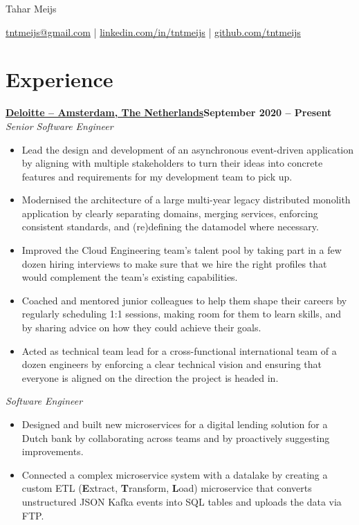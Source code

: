 \documentclass[11pt]{article}       %
\begin{document}
\centerline{\Huge Tahar Meijs}

\vspace{5pt}

\centerline{\href{mailto:tntmeijs@gmail.com}{tntmeijs@gmail.com} | \href{https://www.linkedin.com/in/tntmeijs/}{linkedin.com/in/tntmeijs} | \href{https://github.com/tntmeijs}{github.com/tntmeijs}}

\section*{Experience}
\textbf{\href{https://www.deloitte.com/nl/nl.html}{Deloitte -- Amsterdam, The Netherlands}\hfill September 2020 -- Present} \\
\textit{Senior Software Engineer} \\
\vspace{-9pt}
\begin{itemize}
  \item Lead the design and development of an asynchronous event-driven application by aligning with multiple stakeholders to turn their ideas into concrete features and requirements for my development team to pick up.
  \item Modernised the architecture of a large multi-year legacy distributed monolith application by clearly separating domains, merging services, enforcing consistent standards, and (re)defining the datamodel where necessary.
  \item Improved the Cloud Engineering team's talent pool by taking part in a few dozen hiring interviews to make sure that we hire the right profiles that would complement the team's existing capabilities.
  \item Coached and mentored junior colleagues to help them shape their careers by regularly scheduling 1:1 sessions, making room for them to learn skills, and by sharing advice on how they could achieve their goals.
  \item Acted as technical team lead for a cross-functional international team of a dozen engineers by enforcing a clear technical vision and ensuring that everyone is aligned on the direction the project is headed in.
\end{itemize}

\textit{Software Engineer} \\
\vspace{-9pt}
\begin{itemize}
  \item Designed and built new microservices for a digital lending solution for a Dutch bank by collaborating across teams and by proactively suggesting improvements.
  \item Connected a complex microservice system with a datalake by creating a custom ETL (\textbf{E}xtract, \textbf{T}ransform, \textbf{L}oad) microservice that converts unstructured JSON Kafka events into SQL tables and uploads the data via FTP.
\end{itemize}
\end{document}
